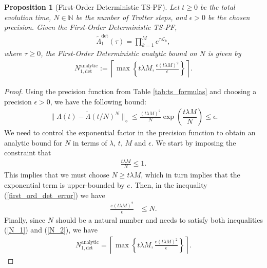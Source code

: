 \documentclass[pdflatex,sn-mathphys-num]{sn-jnl}%
\newtheorem{proposition}{Proposition}
\begin{document}
\begin{proposition}[First-Order Deterministic TS-PF]
Let $t \geq 0$ be the total evolution time, $N \in \mathbb{N}$ be the number of Trotter steps, and $\epsilon > 0$ be the chosen precision. Given the First-Order Deterministic TS-PF,
\begin{align}
\tilde{\Lambda}_{1}^{\text{det}}(\tau) = \prod_{k=1}^{M} e^{\tau \mathcal{L}_{k}},
\end{align}
where $\tau \geq 0$, the First-Order Deterministic analytic bound on $N$ is given by
\begin{align}
N_{1,\text{det}}^{\mathrm{analytic}} := \left\lceil \max \left\{ t \lambda M, \frac{e (t \lambda M)^{2}}{\epsilon} \right\} \right\rceil.
\end{align}
\end{proposition}

\begin{proof}
Using the precision function from Table \ref{tab:ts_formulas} and choosing a precision $\epsilon>0$, we have the following bound:
\begin{align}
\label{first_ord_det_error}
    \|\Lambda(t)-\tilde{\Lambda}(t/N)^{N}\|_{\diamond}\leq \frac{(t\lambda M)^{2}}{N}\exp\left(\dfrac{t\lambda M}{N}\right)\leq \epsilon.
\end{align}
We need to control the exponential factor in the precision function to obtain an analytic bound for $N$ in terms of $\lambda$, $t$, $M$ and $\epsilon$. We start by imposing the constraint that
\begin{align}
\label{N_1}
    \frac{t\lambda M}{N}\leq 1. 
\end{align}
This implies that we must choose $N \geq t\lambda M$, which in turn implies that the exponential term is upper-bounded by $e$. Then, in the inequality (\ref{first_ord_det_error}) we have
\begin{align}
\label{N_2}
    \frac{e(t\lambda M)^{2}}{\epsilon}& \leq N.
\end{align}
Finally, since $N$ should be a natural number and needs to satisfy both inequalities (\ref{N_1}) and (\ref{N_2}), we have 
\begin{align}
    N_{1,\text{det}}^{\text{analytic}} =\left \lceil \max\left\{t\lambda M,  \frac{e(t\lambda M)^{2}}{\epsilon} \right\}\right\rceil.
\end{align}
\end{proof}
\end{document}
